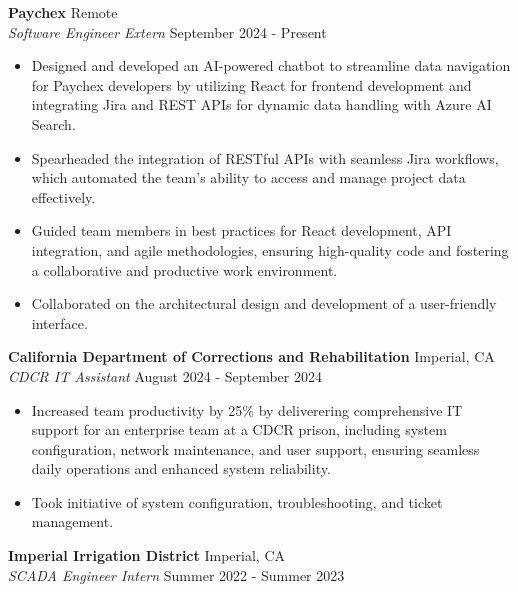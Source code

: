 \documentclass[a4paper]{article}
\begin{document}
\textbf{Paychex} \hfill Remote\\
\textit{Software Engineer Extern} \hfill September 2024 - Present\\
\vspace{-1mm}
\begin{itemize} \itemsep 1pt
	\item Designed and developed an AI-powered chatbot to streamline data navigation for Paychex developers by utilizing React for frontend development and integrating Jira and REST APIs for dynamic data handling with Azure AI Search.
	\item Spearheaded the integration of RESTful APIs with seamless Jira workflows, which automated the team’s ability to access and manage project data effectively.
	\item Guided team members in best practices for React development, API integration, and agile methodologies, ensuring high-quality code and fostering a collaborative and productive work environment.
	\item Collaborated on the architectural design and development of a user-friendly interface.
\end{itemize}
\textbf{California Department of Corrections and Rehabilitation} \hfill Imperial, CA\\
\textit{CDCR IT Assistant} \hfill August 2024 - September 2024\\
\vspace{-1mm}
\begin{itemize} \itemsep 1pt
	\item Increased team productivity by 25\% by deliverering comprehensive IT support for an enterprise team at a CDCR prison, including system configuration, network maintenance, and user support, ensuring seamless daily operations and enhanced system reliability.
	\item Took initiative of system configuration, troubleshooting, and ticket management.
\end{itemize}
\textbf{Imperial Irrigation District} \hfill Imperial, CA\\
\textit{SCADA Engineer Intern} \hfill Summer 2022 - Summer 2023\\
\vspace{-1mm}
\end{document}

